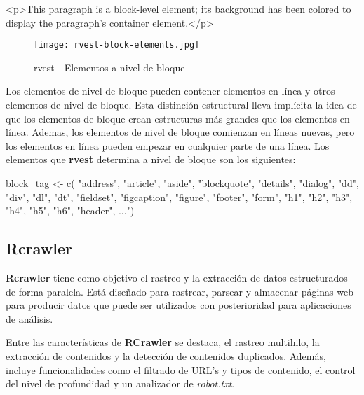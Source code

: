 \begin{Schunk}
  \begin{Soutput}
    <p>This paragraph is a block-level element; its background has been 
    colored to display the paragraph's container element.</p>
  \end{Soutput}
\end{Schunk}

\begin{figure}[tphb]
  \centering
  \texttt{[image: rvest-block-elements.jpg]}
  \caption{rvest - Elementos a nivel de bloque}
  \label{img:rvest - elementos a nivel de bloque}
\end{figure}

Los elementos de nivel de bloque pueden contener elementos en línea y otros elementos de nivel de bloque. 
Esta distinción estructural lleva implícita la idea de que los elementos de bloque crean estructuras más 
grandes que los elementos en línea. Ademas, los elementos de nivel de bloque comienzan en líneas nuevas, 
pero los elementos en línea pueden empezar en cualquier parte de una línea. Los elementos que \textbf{rvest}
determina a nivel de bloque son los siguientes:

\begin{Schunk}
  \begin{Soutput}
    block_tag <- c( "address", "article", "aside", "blockquote", "details", 
      "dialog", "dd", "div", "dl", "dt", "fieldset", "figcaption", "figure", 
      "footer", "form", "h1", "h2", "h3", "h4", "h5", "h6", "header", ...")
  \end{Soutput}
\end{Schunk}

\subsection{Rcrawler}
\label{subsec:rcrawler}

\textbf{Rcrawler} \cite{rcrawler-cran} tiene como objetivo el rastreo y la extracción de datos estructurados
de forma paralela. Está diseñado para rastrear, parsear y almacenar páginas web para producir datos que
puede ser utilizados con posterioridad para aplicaciones de análisis.

Entre las características de \textbf{RCrawler} se destaca, el rastreo multihilo, la extracción de contenidos
y la detección de contenidos duplicados. Además, incluye funcionalidades como el filtrado de URL's y tipos
de contenido, el control del nivel de profundidad y un analizador de \emph{robot.txt}.

